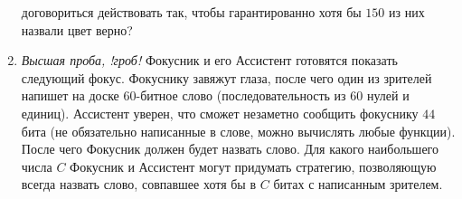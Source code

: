 \begin{enumerate}
    договориться действовать так, чтобы гарантированно хотя бы $150$ из них назвали цвет
    верно?
    \item \textit{Высшая проба, !гроб!} Фокусник и его Ассистент готовятся показать следующий фокус. Фокуснику завяжут глаза, после чего один из зрителей напишет на доске $60$-битное слово (последовательность из $60$ нулей
    и единиц). Ассистент уверен, что сможет незаметно сообщить фокуснику $44$ бита (не обязательно написанные в слове, можно вычислять любые функции). После чего Фокусник должен
    будет назвать слово. Для какого наибольшего числа $C$ Фокусник и Ассистент могут придумать
    стратегию, позволяющую всегда назвать слово, совпавшее хотя бы в $C$ битах с написанным зрителем.
\end{enumerate}
